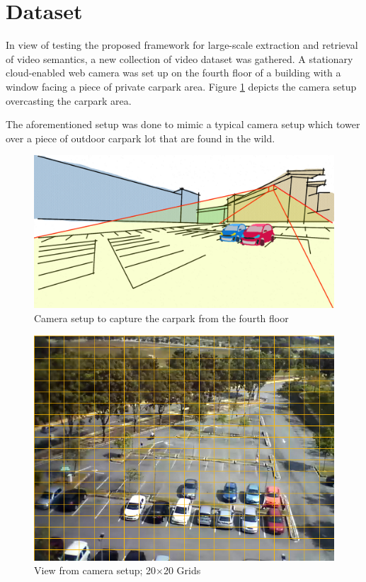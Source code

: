 \section{Dataset}
\label{section:dataset_used}

In view of testing the proposed framework for large-scale extraction and retrieval of video semantics, a new collection of video dataset was gathered. A stationary cloud-enabled web camera was set up on the fourth floor of a building with a window facing a piece of private carpark area. Figure \ref{fig:camerasetup} depicts the camera setup overcasting the carpark area. 

The aforementioned setup was done to mimic a typical camera setup which tower over a piece of outdoor carpark lot that are found in the wild. 


\begin{figure}[hbt!]\centering
\includegraphics[width=.8\textwidth]{image/fcicarpark2.png}
\caption{Camera setup to capture the carpark from the fourth floor}
\label{fig:camerasetup}
\end{figure}


\begin{figure}[!hbt]\centering
\includegraphics[width=.7\textwidth]{image/general/grids.png}
\caption{View from camera setup; 20$\times$20 Grids}
\label{fig:viewfromcamera}
\end{figure}


